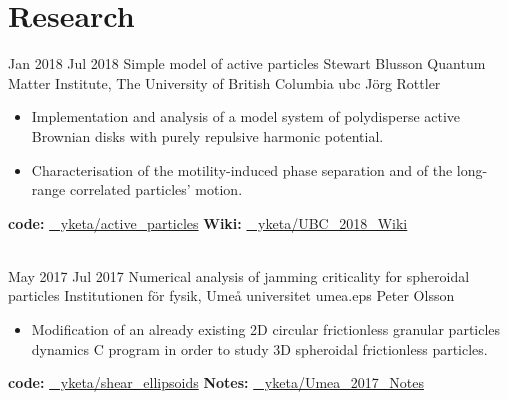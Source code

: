 \documentclass[letterpaper]{cvtemplate_en} %
\begin{document}
\makeprofile %


\section{Research}

\begin{cvbody}

\cvitem
	{Jan 2018}
	{Jul 2018}
  {Simple model of active particles}
  {Stewart Blusson Quantum Matter Institute, The University of British Columbia }
  {ubc}
  {J\"org Rottler}
  {\begin{itemize}
  \item Implementation and analysis of a model system of polydisperse active Brownian disks with purely repulsive harmonic potential.
  \item Characterisation of the motility-induced phase separation and of the long-range correlated particles' motion.\\
  \end{itemize}
  {\bf code:} \href{https://github.com/yketa/active_particles}{\faGithub~ yketa/active\_particles} \hfill {\bf Wiki:} \href{https://github.com/yketa/UBC_2018_Wiki}{\faGithub~ yketa/UBC\_2018\_Wiki}
  }
  \\

\cvitem
	{May 2017}
	{Jul 2017}
	{Numerical analysis of jamming criticality for spheroidal particles}
	{Institutionen f\"{o}r fysik, Ume\r{a} universitet }
	{umea.eps}
	{Peter Olsson}
	{\begin{itemize}
	\item Modification of an already existing 2D circular frictionless granular particles dynamics C
program in order to study 3D spheroidal frictionless particles.\\
	\end{itemize}
	{\bf code:} \href{https://github.com/yketa/shear_ellipsoids}{\faGithub~ yketa/shear\_ellipsoids} \hfill {\bf Notes:} \href{https://github.com/yketa/Umea_2017_Notes}{\faGithub~ yketa/Umea\_2017\_Notes}
	}
  \\


\end{cvbody}
\end{document}
